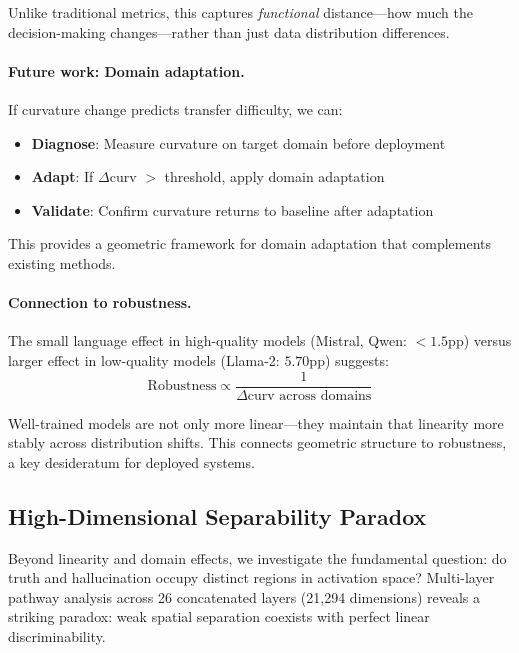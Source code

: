 \documentclass[11pt]{article}
\begin{document}
Unlike traditional metrics, this captures \textit{functional} distance---how much the decision-making changes---rather than just data distribution differences.

\paragraph{Future work: Domain adaptation.}
If curvature change predicts transfer difficulty, we can:
\begin{itemize}
    \item \textbf{Diagnose}: Measure curvature on target domain before deployment
    \item \textbf{Adapt}: If $\Delta$curv $>$ threshold, apply domain adaptation
    \item \textbf{Validate}: Confirm curvature returns to baseline after adaptation
\end{itemize}

This provides a geometric framework for domain adaptation that complements existing methods.

\paragraph{Connection to robustness.}
The small language effect in high-quality models (Mistral, Qwen: $< 1.5$pp) versus larger effect in low-quality models (Llama-2: $5.70$pp) suggests:
\begin{equation}
\text{Robustness} \propto \frac{1}{\Delta \text{curv across domains}}
\end{equation}

Well-trained models are not only more linear---they maintain that linearity more stably across distribution shifts. This connects geometric structure to robustness, a key desideratum for deployed systems.

\subsection{High-Dimensional Separability Paradox}
\label{sec:results-highdim}

Beyond linearity and domain effects, we investigate the fundamental question: do truth and hallucination occupy distinct regions in activation space? Multi-layer pathway analysis across 26 concatenated layers (21,294 dimensions) reveals a striking paradox: weak spatial separation coexists with perfect linear discriminability.
\end{document}
